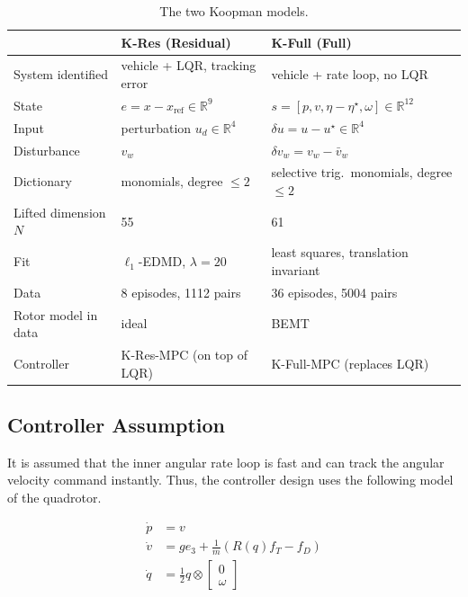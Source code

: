 \documentclass[11pt,a4paper]{article}
\newcommand{\KRes}{\textsf{K-Res}}            %
\newcommand{\KFull}{\textsf{K-Full}}          %
\newcommand{\KResMPC}{\textsf{K-Res-MPC}}     %
\newcommand{\KFullMPC}{\textsf{K-Full-MPC}}   %
\begin{document}
	\begin{table}[ht]
		\centering
		\caption{The two Koopman models.}
		\label{tab:koopman-models}
		\small
		\begin{tabular}{@{}lll@{}}
			\toprule
			& \KRes{} (Residual) & \KFull{} (Full) \\
			\midrule
			System identified & vehicle + LQR, tracking error & vehicle + rate loop, no LQR \\
			State & $e = x - x_{\text{ref}} \in \mathbb{R}^9$ & $s = [p, v, \eta - \eta^\star, \omega] \in \mathbb{R}^{12}$ \\
			Input & perturbation $u_d \in \mathbb{R}^4$ & $\delta u = u - u^\star \in \mathbb{R}^4$ \\
			Disturbance & $v_w$ & $\delta v_w = v_w - \bar{v}_w$ \\
			Dictionary & monomials, degree $\le 2$ & selective trig.\ monomials, degree $\le 2$ \\
			Lifted dimension $N$ & 55 & 61 \\
			Fit & $\ell_1$-EDMD, $\lambda = 20$ & least squares, translation invariant \\
			Data & 8 episodes, 1112 pairs & 36 episodes, 5004 pairs \\
			Rotor model in data & ideal & BEMT \\
			Controller & \KResMPC{} (on top of LQR) & \KFullMPC{} (replaces LQR) \\
			\bottomrule
		\end{tabular}
	\end{table}

	\subsection{Controller Assumption}
	
	It is assumed that the inner angular rate loop is fast and can track the angular velocity command instantly.  Thus, the controller design uses the following model of the quadrotor.
	
	\begin{align}
		\dot{p} &= v \\
		\dot{v} &= g e_3 + \frac{1}{m} (R(q) f_T - f_D) \\
		\dot{q} &= \frac{1}{2} q \otimes  \begin{bmatrix}0 \\ \omega \end{bmatrix}
	\end{align}
	
\end{document}
